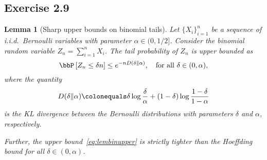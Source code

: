 \documentclass[11pt]{article}
\newcommand{\of}[1]{\left(#1\right)}
\newcommand{\off}[1]{\left[#1\right]}
\theoremstyle{plain}
\newtheorem{lem}{Lemma}
\theoremstyle{definition}
\begin{document}
\subsection{Exercise 2.9}\label{exe:29}
\begin{lem}[Sharp upper bounds on binomial tails]
	Let $\{X_i\}_{i=1}^n$ be a sequence of i.i.d.\ Bernoulli variables with parameter $\alpha \in (0,1/2]$. Consider the binomial random variable $Z_n = \sum_{i=1}^n X_i$. The tail probability of $Z_n$ is upper bounded as
	\begin{equation}\label{eq:lembinupper}
		\bbP\off{Z_n \leq \delta n} \leq e^{-n D\of{\delta \Vert \alpha}}, \quad \text{for all }\delta \in (0,\alpha),
	\end{equation}
	where the quantity 
	\begin{equation}\label{eq:kldiv}
		D(\delta \Vert \alpha) \colonequals \delta \log \frac{\delta}{\alpha} + (1-\delta) \log \frac{1-\delta}{1-\alpha}
	\end{equation}
	is the KL divergence between the Bernoulli distributions with parameters $\delta$ and $\alpha$, respectively.
	
	Further, the upper bound~\eqref{eq:lembinupper} is strictly tighter than the Hoeffding bound for all $\delta \in (0,\alpha)$.
\end{lem}
\end{document}
